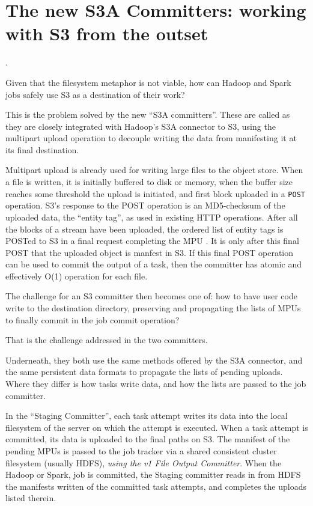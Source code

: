 \documentclass[conference]{IEEEtran}
\begin{document}

\section{The new S3A Committers: working with S3 from the outset}
\label{sec:theNewS3aCommitters:WorkingWithS3FromTheOutset}.


Given that the filesystem metaphor is not viable, how can Hadoop and Spark
jobs safely use S3 as a destination of their work?

This is the problem solved by the new ``S3A committers''.
These are called as they are closely integrated with Hadoop's S3A connector to S3,
using the multipart upload operation to decouple writing the data from
manifesting it at its final destination.

Multipart upload is already used for writing large files to the object store.
When a file is written, it is initially buffered to disk or memory, when the
buffer size reaches some threshold the upload is initiated, and first block uploaded
in a \texttt{POST} operation.
S3's response to the POST operation is an MD5-checksum of the
uploaded data, the ``entity tag'', as used in existing HTTP operations.
After all the blocks of a stream have been uploaded, the ordered list
of entity tags is POSTed to S3 in a final request completing the MPU .
It is only after this final POST that the uploaded object is manfest in S3.
If this final POST operation can be used to commit the output of a task,
then the committer has atomic and effectively O(1) operation for each file.

The challenge for an S3 committer then becomes one of: how to have
user code write to the destination directory, preserving and propagating
the lists of MPUs to finally commit in the job commit operation?

That is the challenge addressed in the two committers.

Underneath, they both use the same methods offered by the S3A connector,
and the same persistent data formats to propagate the lists of pending uploads.
Where they differ is how tasks write data, and how the lists are passed
to the job committer.

In the ``Staging Committer'', each task attempt writes its data into the local
filesystem of the server on which the attempt is executed.
When a task attempt is committed, its data is uploaded to the final
paths on S3.
The manifest of the pending MPUs is passed to the job tracker via
a shared consistent cluster filesystem (usually HDFS), \emph{using the v1
File Output Committer}.
When the Hadoop or Spark, job is committed, the Staging committer reads in
from HDFS the manifests written of the committed task attempts, and
completes the uploads listed therein.
\end{document}

